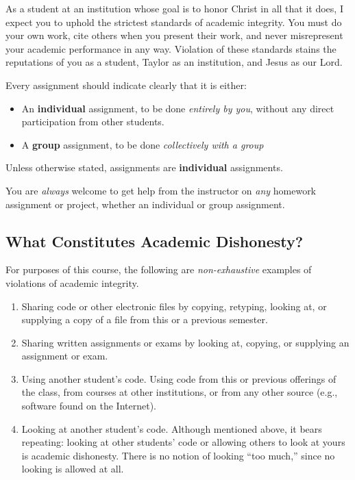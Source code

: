 As a student at an institution whose goal is to honor Christ in all that it does,
I expect you to uphold the strictest standards of academic integrity.
You must do your own work,
cite others when you present their work,
and never misrepresent your academic performance in any way.
Violation of these standards stains the reputations of you as a student,
Taylor as an institution,
and Jesus as our Lord.

Every assignment should indicate clearly
that it is either:
\begin{itemize}
\item An \textbf{individual} assignment,
  to be done \emph{entirely by you},
  without any direct participation from other students.
\item A \textbf{group} assignment, to be done \emph{collectively with a group}
\end{itemize}
Unless otherwise stated,
assignments are \textbf{individual} assignments.

\begin{flushleft}
  \begin{framed}
    You are \emph{always} welcome
    to get help from the instructor on \emph{any}
    homework assignment or project,
    whether an individual or group assignment.
  \end{framed}
\end{flushleft}

\subsection{What Constitutes Academic Dishonesty?}

For purposes of this course, the following are \emph{non-exhaustive} examples
of violations of academic integrity.
\begin{enumerate}
\item
  Sharing code or other electronic files by copying, retyping, looking at,
  or supplying a copy of a file from this or a previous semester. 
\item
  Sharing written assignments or exams by looking at, copying, or supplying
  an assignment or exam.
\item
  Using another student's code. Using code from this or previous offerings of the
  class, from courses at other institutions, or from any other source (e.g.,
  software found on the Internet).
\item Looking at another student's code. Although mentioned above, it bears
  repeating: looking at other students' code or allowing others to look at yours
  is academic dishonesty. There is no notion of looking ``too much,'' since no looking is
  allowed at all.
\end{enumerate}

